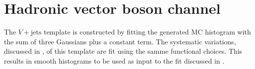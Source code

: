 \section{Hadronic vector boson channel} \label{sec:background:vqq}

The $V+\text{jets}$ template is constructed by fitting the generated MC
histogram with the sum of three Gaussians plus a constant term.  The systematic
variations, discussed in , of this template are fit
using the samme functional choices.  This results in smooth histograms to be
used as input to the fit discussed in .
